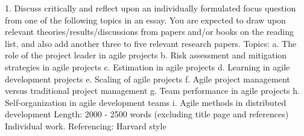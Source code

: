 1. Discuss critically and reflect upon an individually formulated focus question from one of the following topics in an essay. You are expected to draw upon relevant theories/results/discussions from papers and/or books on the reading list, and also add another three to five relevant research papers.
Topics:
a. The role of the project leader in agile projects
b. Risk assessment and mitigation strategies in agile projects
c. Estimation in agile projects
d. Learning in agile development projects
e. Scaling of agile projects
f. Agile project management versus traditional project management
g. Team performance in agile projects
h. Self-organization in agile development teams
i. Agile methods in distributed development
Length:
2000 - 2500 words (excluding title page and references)
Individual work.
Referencing: Harvard style